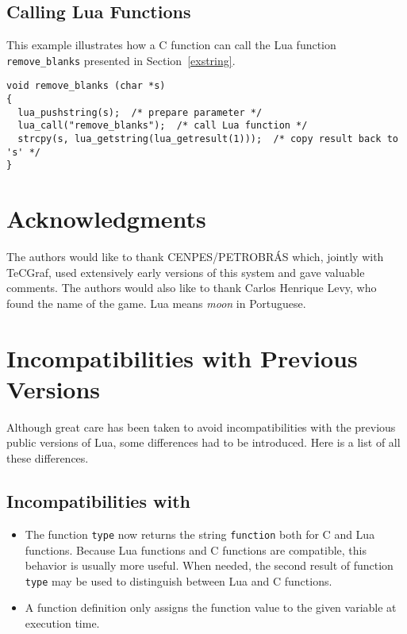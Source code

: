 \subsection{Calling Lua Functions} \label{exLuacall}

This example illustrates how a C function can call the Lua function
\verb'remove_blanks' presented in Section~\ref{exstring}.
\begin{verbatim}
void remove_blanks (char *s)
{
  lua_pushstring(s);  /* prepare parameter */
  lua_call("remove_blanks");  /* call Lua function */
  strcpy(s, lua_getstring(lua_getresult(1)));  /* copy result back to 's' */
}
\end{verbatim}


\section*{Acknowledgments}

The authors would like to thank CENPES/PETROBR\'AS which,
jointly with TeCGraf, used extensively early versions of
this system and gave valuable comments.
The authors would also like to thank Carlos Henrique Levy,
who found the name of the game.
Lua means {\em moon} in Portuguese.



\appendix

\section{Incompatibilities with Previous Versions}

Although great care has been taken to avoid incompatibilities with
the previous public versions of Lua,
some differences had to be introduced.
Here is a list of all these differences.

\subsection*{Incompatibilities with }
\begin{itemize}
\item
The function {\tt type} now returns the string {\tt function}
both for C and Lua functions.
Because Lua functions and C functions are compatible,
this behavior is usually more useful.
When needed, the second result of function {\tt type} may be used
to distinguish between Lua and C functions.
\item
A function definition only assigns the function value to the
given variable at execution time.
\end{itemize}

